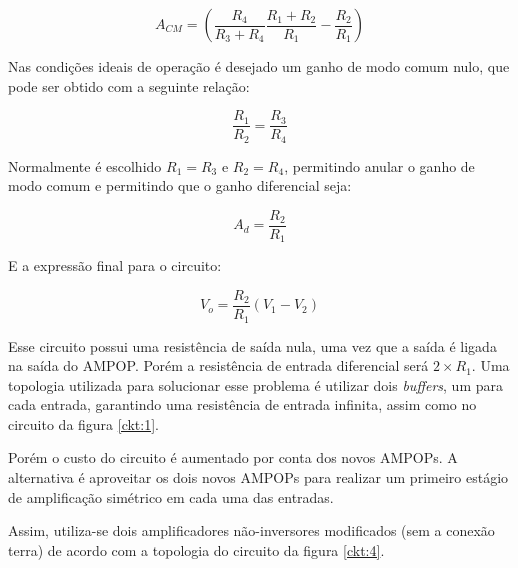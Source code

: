 \begin{center}
\begin{equation} \label{acm:1}
        A_{CM} = \left(\frac{R_4}{R_3+R_4}\frac{R_1+R_2}{R_1} - \frac{R_2}{R_1}\right)
\end{equation}
\end{center}

Nas condições ideais de operação é desejado um ganho de modo comum nulo, que pode ser obtido com a seguinte relação:

\begin{center}
\begin{equation} \label{r:1}
        \frac{R_1}{R_2} = \frac{R_3}{R_4}
\end{equation}
\end{center}

Normalmente é escolhido $R_1=R_3$ e $R_2=R_4$, permitindo anular o ganho de modo comum e permitindo que o ganho diferencial seja:

\begin{center}
\begin{equation} \label{ad:2}
        A_d = \frac{R_2}{R_1}
\end{equation}
\end{center}

E a expressão final para o circuito:

\begin{center}
\begin{equation} \label{ad:2}
        V_o = \frac{R_2}{R_1}(V_1-V_2)
\end{equation}
\end{center}

Esse circuito possui uma resistência de saída nula, uma vez que a saída é ligada na saída do AMPOP. Porém a resistência de entrada diferencial será $2\times R_1$. Uma topologia utilizada para solucionar esse problema é utilizar dois \textit{buffers}, um para cada entrada, garantindo uma resistência de entrada infinita, assim como no circuito da figura \ref{ckt:1}.

Porém o custo do circuito é aumentado por conta dos novos AMPOPs. A alternativa é aproveitar os dois novos AMPOPs para realizar um primeiro estágio de amplificação simétrico em cada uma das entradas.

Assim, utiliza-se dois amplificadores não-inversores modificados (sem a conexão terra) de acordo com a topologia do circuito da figura \ref{ckt:4}.



